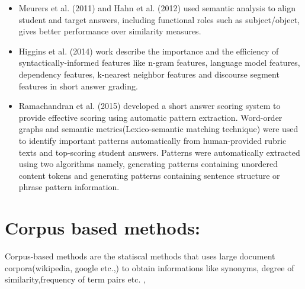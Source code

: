 \begin{itemize}
	\item Meurers et al. (2011) \cite{Meurers2011} and Hahn et al. (2012) \cite{Hahn2012} used semantic analysis to align student and target answers, including functional roles such as subject/object, gives better performance over similarity measures.
	\item Higgins et al. (2014) \cite{Higgins2014} work describe the importance and the efficiency of syntactically-informed features like n-gram features, language model features, dependency features, k-nearest neighbor features and discourse segment features in short answer grading.
	\item Ramachandran et al. (2015) \cite{Ramachandran2015} developed a short answer scoring system to provide effective scoring using automatic pattern extraction. Word-order graphs and semantic metrics(Lexico-semantic matching technique) were used to identify important patterns automatically from human-provided rubric texts and top-scoring student answers. Patterns were automatically extracted using two algorithms namely, generating patterns containing unordered content tokens and generating patterns containing sentence structure or phrase pattern information.
	
\end{itemize}

\section{Corpus based methods:}

Corpus-based methods are the statiscal methods that uses large document corpora(wikipedia, google etc.,) to obtain informations like synonyms, degree of similarity,frequency of term pairs etc. \cite{Burrows2015},

